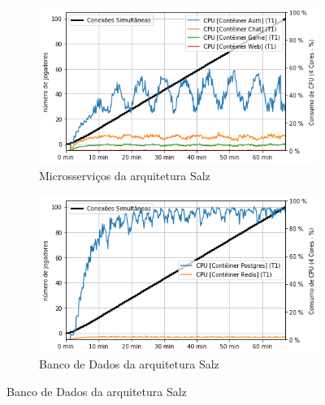 \begin{figure}[htb!]
    \begin{subfigure}{.5\textwidth}
        \centering
        \includegraphics[width=.95\linewidth]{figuras/testes/s_cpu_game.png}
        \caption{Microsserviços da arquitetura Salz}
        \label{fig:s_cpu_game}
    \end{subfigure}%
    \begin{subfigure}{.5\textwidth}
        \centering
        \includegraphics[width=.95\linewidth]{figuras/testes/s_cpu_db.png}
        \caption{Banco de Dados da arquitetura Salz}
        \label{fig:s_cpu_db}
    \end{subfigure}%


\end{figure}
